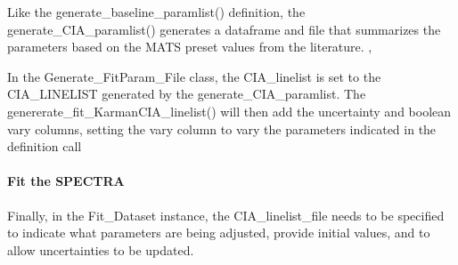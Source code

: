 \documentclass[letterpaper,10pt,english]{sphinxmanual}
\begin{document}
\sphinxAtStartPar
Like the generate\_baseline\_paramlist() definition, the generate\_CIA\_paramlist() generates a dataframe and file that summarizes the parameters based on the MATS preset values from the literature. , 

\begin{sphinxVerbatim}[commandchars=\\\{\}]
  \PYG{p}{[}     \PYG{p}{]}
                                                 

  
  
\end{sphinxVerbatim}

\sphinxAtStartPar
In the Generate\_FitParam\_File class, the CIA\_linelist is set to the CIA\_LINELIST generated by the generate\_CIA\_paramlist. The genererate\_fit\_KarmanCIA\_linelist() will then add the uncertainty and boolean vary columns, setting the vary column to vary the parameters indicated in the definition call


\paragraph{Fit the SPECTRA}
\label{\detokenize{Oxygen CIA using theoretical model:fit-the-spectra}}
\sphinxAtStartPar
Finally, in the Fit\_Dataset instance, the CIA\_linelist\_file needs to be specified to indicate what parameters are being adjusted, provide initial values, and to allow uncertainties to be updated.
\end{document}
